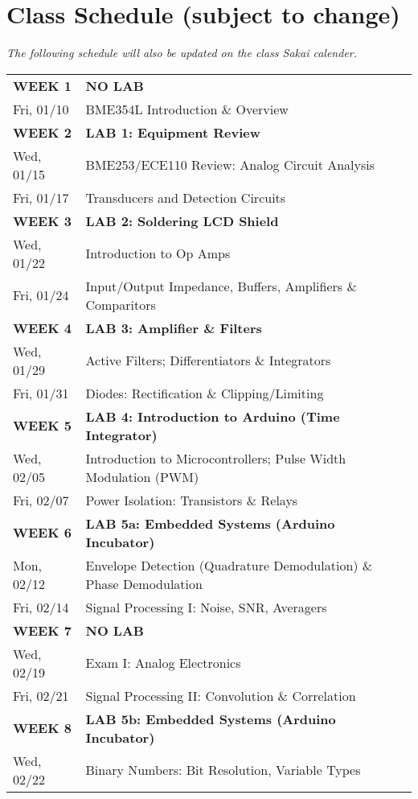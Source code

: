 \section{Class Schedule (subject to change)}
\emph{The following schedule will also be updated on the class Sakai calender.}\\
\begin{tabular}{|l|l|} \hline
{\bf WEEK 1}      &   {\bf NO LAB} \\
Fri, 01/10  &   BME354L Introduction \& Overview \\ \hline
{\bf WEEK 2}      &   {\bf LAB 1: Equipment Review} \\
Wed, 01/15  &   BME253/ECE110 Review: Analog Circuit Analysis\\
Fri, 01/17  &   Transducers and Detection Circuits \\ \hline
{\bf WEEK 3}      &   {\bf LAB 2: Soldering LCD Shield} \\
Wed, 01/22  &   Introduction to Op Amps \\ 
Fri, 01/24  &   Input/Output Impedance, Buffers, Amplifiers \& Comparitors \\ \hline
{\bf WEEK 4}      &   {\bf LAB 3: Amplifier \& Filters} \\
Wed, 01/29  &   Active Filters; Differentiators \& Integrators \\
Fri, 01/31  &   Diodes: Rectification \& Clipping/Limiting \\ \hline
{\bf WEEK 5}      &   {\bf LAB 4: Introduction to Arduino (Time Integrator)} \\
Wed, 02/05  &   Introduction to Microcontrollers; Pulse Width Modulation (PWM)\\
Fri, 02/07  &   Power Isolation: Transistors \& Relays \\ \hline
{\bf WEEK 6}      &   \textbf{LAB 5a: Embedded Systems (Arduino Incubator)} \\
Mon, 02/12  &   Envelope Detection (Quadrature Demodulation) \& Phase Demodulation \\ 
Fri, 02/14  &   Signal Processing I: Noise, SNR, Averagers\\ \hline
{\bf WEEK 7}      &   {\bf NO LAB}\\
Wed, 02/19  &   Exam I: Analog Electronics \\ 
Fri, 02/21  &   Signal Processing II: Convolution \& Correlation\\ \hline
{\bf WEEK 8}      &   \textbf{LAB 5b: Embedded Systems (Arduino Incubator)} \\
Wed, 02/22  &   Binary Numbers: Bit Resolution, Variable Types \\ \hline

\end{tabular}
